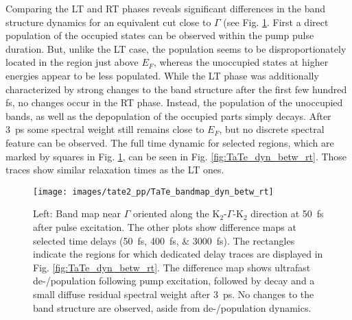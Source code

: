 Comparing the LT and RT phases reveals significant differences in the band structure dynamics for an equivalent cut close to $\Gamma$ (see Fig. \ref{fig:TaTe_bandmap_dyn_betw_rt}.
First a direct population of the occupied states can be observed within the pump pulse duration.
But, unlike the LT case, the population seems to be disproportionately located in the region just above $E_F$, whereas the unoccupied states at higher energies appear to be less populated.
While the LT phase was additionally characterized by strong changes to the band structure after the first few hundred \unit{\femto\second}, no changes occur in the RT phase.
Instead, the population of the unoccupied bands, as well as the depopulation of the occupied parts simply decays.
After \qty{3}{\pico\second} some spectral weight still remains close to $E_F$, but no discrete spectral feature can be observed.
The full time dynamic for selected regions, which are marked by squares in Fig. \ref{fig:TaTe_bandmap_dyn_betw_rt}, can be seen in Fig. \ref{fig:TaTe_dyn_betw_rt}.
Those traces show similar relaxation times as the LT ones.

\begin{figure}[t!]
	\centering
	\texttt{[image: images/tate2\_pp/TaTe\_bandmap\_dyn\_betw\_rt]}
	\caption{Left: Band map near $\Gamma$ oriented along the K$_2$-$\Gamma$-K$_2$ direction at \qty{50}{\femto\second} after pulse excitation. The other plots show difference maps at selected time delays (\qtylist{50;400;3000}{\femto\second}). The rectangles indicate the regions for which dedicated delay traces are displayed in Fig. \ref{fig:TaTe_dyn_betw_rt}. The difference map shows ultrafast de-/population following pump excitation, followed by decay and a small diffuse residual spectral weight after \qty{3}{\pico\second}. No changes to the band structure are observed, aside from de-/population dynamics.}
	\label{fig:TaTe_bandmap_dyn_betw_rt}
\end{figure}

